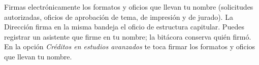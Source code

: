 \documentclass[11pt,a4paper]{article}
\begin{document}
{\small\tableofcontents}
\newpage
\begin{quevasahacer}
Firmas electrónicamente los formatos y oficios que llevan tu nombre (solicitudes autorizadas, oficios de aprobación de tema, de impresión y de jurado). La Dirección firma en la misma bandeja el oficio de estructura capitular. Puedes registrar un asistente que firme en tu nombre; la bitácora conserva quién firmó. En la opción \emph{Créditos en estudios avanzados} te toca firmar los formatos y oficios que llevan tu nombre.
\end{quevasahacer}



\end{document}
